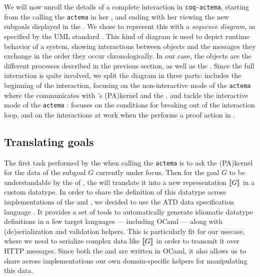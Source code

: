 We will now unroll the details of a complete interaction in \texttt{coq-actema},
starting from the  calling the \texttt{actema}  in her
, and ending with her viewing the new subgoals displayed in the
. We chose to represent this with a \emph{sequence diagram}, as
specified by the UML standard \cite{enwiki:1153944336}. This kind of diagram is
used to depict runtime behavior of a system, showing interactions between
objects and the messages they exchange in the order they occur chronologically.
In our case, the objects are the different processes described in the previous
section, as well as the . Since the full interaction is quite
involved, we split the diagram in three parts:  includes the
beginning of the interaction, focusing on the non-interactive mode of the
\texttt{actema}  where the  communicates with 's
\kl(PA){kernel} and the .  and
 tackle the interactive mode of the \texttt{actema} :
 focuses on the conditions for breaking out of the interaction
loop, and  on the interactions at work when the 
performs a proof action in .

\subsection{Translating goals}

The first task performed by the  when calling the
\texttt{actema}  is to ask the \kl(PA){kernel} for the data of the subgoal $G$
currently under focus. Then for the goal $G$ to be understandable by the
 of , the  will translate it into a new
representation $\llbracket G \rrbracket$ in a custom datatype. In order to share the
definition of this datatype across implementations of the  and
, we decided to use the ATD data specification language
\cite{ATD}. It provides a set of tools to automatically generate idiomatic
datatype definitions in a few target languages --- including OCaml --- along
with (de)serialization and validation helpers. This is particularly fit for our
usecase, where we need to serialize complex data like $\llbracket G \rrbracket$ in order to
transmit it over HTTP messages. Since both the  and
 are written in OCaml, it also allows us to share across
implementations our own domain-specific helpers for manipulating this data.

